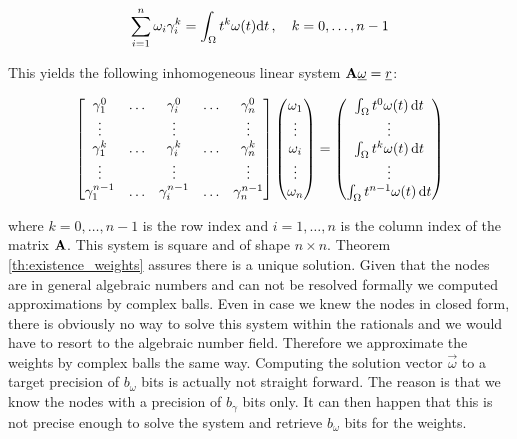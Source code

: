 \documentclass[a4paper,10pt]{article}
\begin{document}
\begin{equation}
  \sum_{i=1}^{n} \omega_i \gamma_i^k = \int_{\Omega} t^k \omega(t) \mathrm{d}t \,,
  \quad k = 0, \ldots, n-1
\end{equation}

This yields the following inhomogeneous linear system $\mathbf{A} \underline{\omega} = \underline{r}$:

\begin{equation}
  \begin{bmatrix}
    \gamma_1^0     & \hdots & \gamma_i^0     & \hdots & \gamma_n^0 \\
    \vdots         & {}     & \vdots         & {}     & \vdots \\
    \gamma_1^k     & \hdots & \gamma_i^k     & \hdots & \gamma_n^k \\
    \vdots         & {}     & \vdots         & {}     & \vdots \\
    \gamma_1^{n-1} & \hdots & \gamma_i^{n-1} & \hdots & \gamma_n^{n-1}
  \end{bmatrix}
  \begin{pmatrix}
    \omega_1 \\
    \vdots \\
    \omega_i \\
    \vdots \\
    \omega_n
  \end{pmatrix}
  =
  \begin{pmatrix}
  \int_{\Omega} t^0 \omega(t) \,\mathrm{d}t \\
  \vdots \\
  \int_{\Omega} t^k \omega(t) \,\mathrm{d}t \\
  \vdots \\
  \int_{\Omega} t^{n-1} \omega(t) \,\mathrm{d}t
  \end{pmatrix}
\end{equation}

where $k = 0, \ldots, n-1$ is the row index and $i = 1, \ldots, n$
is the column index of the matrix $\mathbf{A}$. This system is square
and of shape $n \times n$. Theorem \ref{th:existence_weights} assures there is
a unique solution. Given that the nodes are in general algebraic numbers
and can not be resolved formally we computed approximations by complex
balls. Even in case we knew the nodes in closed form, there is obviously
no way to solve this system within the rationals and we would have to resort
to the algebraic number field. Therefore we approximate the weights by complex
balls the same way. Computing the solution vector $\vec{\omega}$ to a target
precision of $b_{\omega}$ bits is actually not straight forward. The reason is
that we know the nodes with a precision of $b_{\gamma}$ bits only. It can then
happen that this is not precise enough to solve the system and retrieve $b_{\omega}$
bits for the weights.
\end{document}
